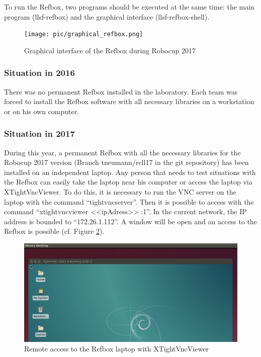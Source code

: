 To run the Refbox, two programs should be executed at the same time: the main program (llsf-refbox) and the graphical interface (llsf-refbox-shell).

\begin{figure}[!h]
\centering
\texttt{[image: pic/graphical\_refbox.png]}
\caption{Graphical interface of the Refbox during Robocup 2017}
\label{fig:graphicalRefbox}
\end{figure}

\subsubsection{Situation in 2016}

There was no permanent Refbox installed in the laboratory. Each team was forced to install the Refbox software with all necessary libraries on a workstation or on his own computer. \\

\subsubsection{Situation in 2017}

During this year, a permanent Refbox with all the necessary libraries for the Robocup 2017 version (Branch tneumann/rcll17 in the git repository) has been installed on an independent laptop. Any person that needs to test situations with the Refbox can easily take the laptop near his computer or access the laptop via XTightVncViewer. To do this, it is necessary to run the VNC server on the laptop with the command “tightvncserver”. Then it is possible to access with the command “xtightvncviewer <<ipAdress>> :1”.  In the current network, the IP address is bounded to “172.26.1.112”. A window will be open and an access to the Refbox is possible (cf. Figure \ref{fig:xtightvncviewer}).\\

\begin{figure}[!h]
\centering
\includegraphics[width=\linewidth]{pic/xtightvncviewer.png}
\caption{Remote access to the Refbox laptop with XTightVncViewer}
\label{fig:xtightvncviewer}
\end{figure}

